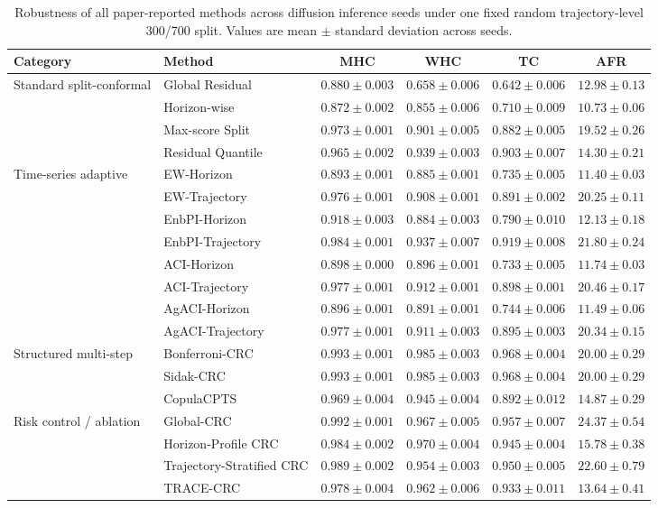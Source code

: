 \begin{table}[!htbp]
\centering
\scriptsize
\caption{Robustness of all paper-reported methods across diffusion inference seeds under one fixed random trajectory-level 300/700 split. Values are mean $\pm$ standard deviation across seeds.}
\label{tab:all-method-seed-robustness}
\begin{tabular}{llcccc}
\toprule
Category & Method & MHC & WHC & TC & AFR \\
\midrule
Standard split-conformal & Global Residual & $0.880 \pm 0.003$ & $0.658 \pm 0.006$ & $0.642 \pm 0.006$ & $12.98 \pm 0.13$ \\
 & Horizon-wise & $0.872 \pm 0.002$ & $0.855 \pm 0.006$ & $0.710 \pm 0.009$ & $10.73 \pm 0.06$ \\
 & Max-score Split & $0.973 \pm 0.001$ & $0.901 \pm 0.005$ & $0.882 \pm 0.005$ & $19.52 \pm 0.26$ \\
 & Residual Quantile & $0.965 \pm 0.002$ & $0.939 \pm 0.003$ & $0.903 \pm 0.007$ & $14.30 \pm 0.21$ \\
Time-series adaptive & EW-Horizon & $0.893 \pm 0.001$ & $0.885 \pm 0.001$ & $0.735 \pm 0.005$ & $11.40 \pm 0.03$ \\
 & EW-Trajectory & $0.976 \pm 0.001$ & $0.908 \pm 0.001$ & $0.891 \pm 0.002$ & $20.25 \pm 0.11$ \\
 & EnbPI-Horizon & $0.918 \pm 0.003$ & $0.884 \pm 0.003$ & $0.790 \pm 0.010$ & $12.13 \pm 0.18$ \\
 & EnbPI-Trajectory & $0.984 \pm 0.001$ & $0.937 \pm 0.007$ & $0.919 \pm 0.008$ & $21.80 \pm 0.24$ \\
 & ACI-Horizon & $0.898 \pm 0.000$ & $0.896 \pm 0.001$ & $0.733 \pm 0.005$ & $11.74 \pm 0.03$ \\
 & ACI-Trajectory & $0.977 \pm 0.001$ & $0.912 \pm 0.001$ & $0.898 \pm 0.001$ & $20.46 \pm 0.17$ \\
 & AgACI-Horizon & $0.896 \pm 0.001$ & $0.891 \pm 0.001$ & $0.744 \pm 0.006$ & $11.49 \pm 0.06$ \\
 & AgACI-Trajectory & $0.977 \pm 0.001$ & $0.911 \pm 0.003$ & $0.895 \pm 0.003$ & $20.34 \pm 0.15$ \\
Structured multi-step & Bonferroni-CRC & $0.993 \pm 0.001$ & $0.985 \pm 0.003$ & $0.968 \pm 0.004$ & $20.00 \pm 0.29$ \\
 & Sidak-CRC & $0.993 \pm 0.001$ & $0.985 \pm 0.003$ & $0.968 \pm 0.004$ & $20.00 \pm 0.29$ \\
 & CopulaCPTS & $0.969 \pm 0.004$ & $0.945 \pm 0.004$ & $0.892 \pm 0.012$ & $14.87 \pm 0.29$ \\
Risk control / ablation & Global-CRC & $0.992 \pm 0.001$ & $0.967 \pm 0.005$ & $0.957 \pm 0.007$ & $24.37 \pm 0.54$ \\
 & Horizon-Profile CRC & $0.984 \pm 0.002$ & $0.970 \pm 0.004$ & $0.945 \pm 0.004$ & $15.78 \pm 0.38$ \\
 & Trajectory-Stratified CRC & $0.989 \pm 0.002$ & $0.954 \pm 0.003$ & $0.950 \pm 0.005$ & $22.60 \pm 0.79$ \\
 & TRACE-CRC & $0.978 \pm 0.004$ & $0.962 \pm 0.006$ & $0.933 \pm 0.011$ & $13.64 \pm 0.41$ \\
\bottomrule
\end{tabular}
\end{table}
